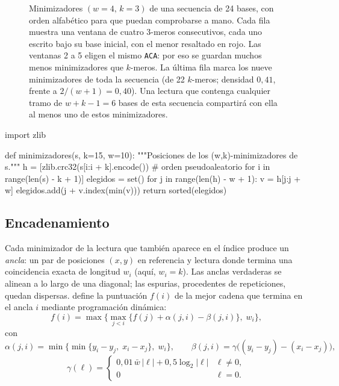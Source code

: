 \begin{figure}[tbp]
\centering

\caption[Minimizadores de una secuencia]{Minimizadores $(w=4,\,k=3)$ de una secuencia de 24 bases, con orden alfabético para que puedan comprobarse a mano. Cada fila muestra una ventana de cuatro 3-meros consecutivos, cada uno escrito bajo su base inicial, con el menor resaltado en rojo. Las ventanas 2 a 5 eligen el mismo \texttt{ACA}: por eso se guardan muchos menos minimizadores que $k$-meros. La última fila marca los nueve minimizadores de toda la secuencia (de 22 $k$-meros; densidad $0{,}41$, frente a $2/(w+1)=0{,}40$). Una lectura que contenga cualquier tramo de $w+k-1=6$ bases de esta secuencia compartirá con ella al menos uno de estos minimizadores.}
\label{fig:07-minimizadores}
\end{figure}

\begin{codigo}[minimizadores.py]
import zlib

def minimizadores(s, k=15, w=10):
    """Posiciones de los (w,k)-minimizadores de s."""
    h = [zlib.crc32(s[i:i + k].encode())         # orden pseudoaleatorio
         for i in range(len(s) - k + 1)]
    elegidos = set()
    for j in range(len(h) - w + 1):
        v = h[j:j + w]
        elegidos.add(j + v.index(min(v)))
    return sorted(elegidos)
\end{codigo}

\subsection{Encadenamiento}

Cada minimizador de la lectura que también aparece en el índice produce un \emph{ancla}: un par de posiciones $(x,y)$ en referencia y lectura donde termina una coincidencia exacta de longitud $w_i$ (aquí, $w_i=k$). Las anclas verdaderas se alinean a lo largo de una diagonal; las espurias, procedentes de repeticiones, quedan dispersas. \textcite{c07-li2018} define la puntuación $f(i)$ de la mejor cadena que termina en el ancla $i$ mediante programación dinámica:
\begin{equation}\label{eq:07-cadena}
f(i) = \max\Big\{\max_{j<i}\big\{f(j) + \alpha(j,i) - \beta(j,i)\big\},\; w_i\Big\},
\end{equation}
con
\begin{equation}\label{eq:07-alfabeta}
\alpha(j,i) = \min\big\{\min\{y_i-y_j,\; x_i-x_j\},\; w_i\big\},\qquad
\beta(j,i) = \gamma\big((y_i-y_j)-(x_i-x_j)\big),
\end{equation}
\begin{equation}\label{eq:07-gamma}
\gamma(\ell) = \begin{cases}
0{,}01\,\bar w\,|\ell| + 0{,}5\log_2|\ell| & \ell\neq 0,\\
0 & \ell = 0.
\end{cases}
\end{equation}

